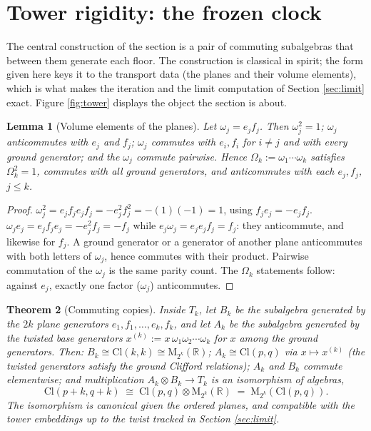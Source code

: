 \documentclass[11pt]{article}
\newtheorem{theorem}{Theorem}[section]
\newtheorem{lemma}[theorem]{Lemma}
\theoremstyle{definition}
\newcommand{\Cl}{\mathrm{Cl}}
\newcommand{\R}{\mathbb{R}}
\newcommand{\Mat}{\mathrm{M}}
\begin{document}
\section{Tower rigidity: the frozen clock}\label{sec:rigidity}

The central construction of the section is a pair of commuting subalgebras that between them generate each floor. The construction is classical in spirit; the form given here keys it to the transport data (the planes and their volume elements), which is what makes the iteration and the limit computation of Section \ref{sec:limit} exact. Figure \ref{fig:tower} displays the object the section is about.

\begin{lemma}[Volume elements of the planes]\label{lem:volumes}
Let $\omega_j = e_j f_j$. Then $\omega_j^2 = 1$; $\omega_j$ anticommutes with $e_j$ and $f_j$; $\omega_j$ commutes with $e_i, f_i$ for $i \neq j$ and with every ground generator; and the $\omega_j$ commute pairwise. Hence $\Omega_k := \omega_1 \cdots \omega_k$ satisfies $\Omega_k^2 = 1$, commutes with all ground generators, and anticommutes with each $e_j, f_j$, $j \leq k$.
\end{lemma}

\begin{proof}
$\omega_j^2 = e_j f_j e_j f_j = -e_j^2 f_j^2 = -(1)(-1) = 1$, using $f_j e_j = -e_j f_j$. $\omega_j e_j = e_j f_j e_j = -e_j^2 f_j = -f_j$ while $e_j \omega_j = e_j e_j f_j = f_j$: they anticommute, and likewise for $f_j$. A ground generator or a generator of another plane anticommutes with both letters of $\omega_j$, hence commutes with their product. Pairwise commutation of the $\omega_j$ is the same parity count. The $\Omega_k$ statements follow: against $e_j$, exactly one factor ($\omega_j$) anticommutes.
\end{proof}

\begin{theorem}[Commuting copies]\label{thm:commuting}
Inside $T_k$, let $B_k$ be the subalgebra generated by the $2k$ plane generators $e_1, f_1, \dots, e_k, f_k$, and let $A_k$ be the subalgebra generated by the twisted base generators $x^{(k)} := x\,\omega_1 \omega_2 \cdots \omega_k$ for $x$ among the ground generators. Then: $B_k \cong \Cl(k,k) \cong \Mat_{2^k}(\R)$; $A_k \cong \Cl(p,q)$ via $x \mapsto x^{(k)}$ (the twisted generators satisfy the ground Clifford relations); $A_k$ and $B_k$ commute elementwise; and multiplication $A_k \otimes B_k \to T_k$ is an isomorphism of algebras,
\[
\Cl(p{+}k, q{+}k) \;\cong\; \Cl(p,q) \otimes \Mat_{2^k}(\R) \;=\; \Mat_{2^k}(\Cl(p,q)).
\]
The isomorphism is canonical given the ordered planes, and compatible with the tower embeddings up to the twist tracked in Section \ref{sec:limit}.
\end{theorem}
\end{document}
